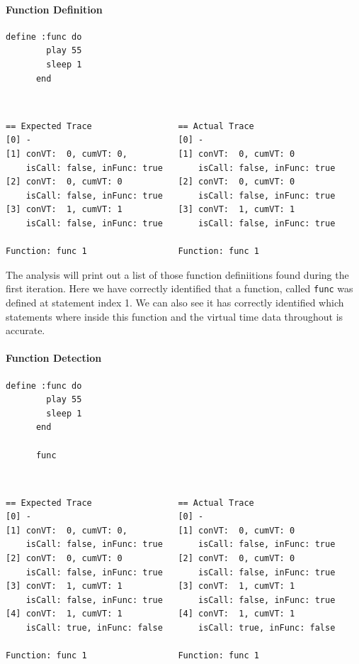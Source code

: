 \documentclass[11pt, abstracton, twoside, titlepage=true]{scrartcl}
\begin{document}
\paragraph{Function Definition}
\begin{minipage}{\textwidth}
	\begin{lstlisting}[style = sonicpi]
      define :func do
        play 55
        sleep 1
      end
	\end{lstlisting}
\end{minipage}
\\
\begin{lstlisting}
== Expected Trace                 == Actual Trace
[0] -                             [0] -
[1] conVT:  0, cumVT: 0,          [1] conVT:  0, cumVT: 0
    isCall: false, inFunc: true       isCall: false, inFunc: true            
[2] conVT:  0, cumVT: 0           [2] conVT:  0, cumVT: 0
    isCall: false, inFunc: true       isCall: false, inFunc: true 
[3] conVT:  1, cumVT: 1           [3] conVT:  1, cumVT: 1
    isCall: false, inFunc: true       isCall: false, inFunc: true 

Function: func 1                  Function: func 1
\end{lstlisting}

The analysis will print out a list of those function definiitions found during 
the first iteration. Here we have correctly identified that a function, called 
\texttt{func} was defined at statement index 1. We can also see it has correctly 
identified which statements where inside this function and the virtual time data 
throughout is accurate.

\paragraph{Function Detection}
\begin{minipage}{\textwidth}
	\begin{lstlisting}[style = sonicpi]
      define :func do
        play 55
        sleep 1
      end

      func
	\end{lstlisting}
\end{minipage}
\\
\begin{lstlisting}
== Expected Trace                 == Actual Trace
[0] -                             [0] -
[1] conVT:  0, cumVT: 0,          [1] conVT:  0, cumVT: 0
    isCall: false, inFunc: true       isCall: false, inFunc: true            
[2] conVT:  0, cumVT: 0           [2] conVT:  0, cumVT: 0
    isCall: false, inFunc: true       isCall: false, inFunc: true 
[3] conVT:  1, cumVT: 1           [3] conVT:  1, cumVT: 1
    isCall: false, inFunc: true       isCall: false, inFunc: true 
[4] conVT:  1, cumVT: 1           [4] conVT:  1, cumVT: 1
    isCall: true, inFunc: false       isCall: true, inFunc: false 

Function: func 1                  Function: func 1
\end{lstlisting}
\end{document}
